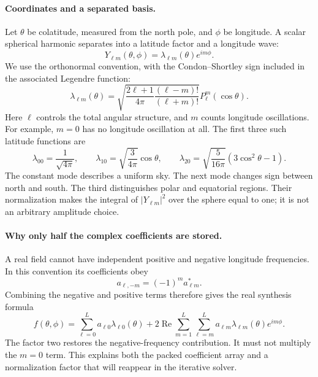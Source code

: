 \documentclass[11pt]{article}
\begin{document}
\paragraph{Coordinates and a separated basis.}
Let $\theta$ be colatitude, measured from the north pole, and $\phi$ be
longitude. A scalar spherical harmonic separates into a latitude factor
and a longitude wave:
\begin{equation}
 Y_{\ell m}(\theta,\phi)=\lambda_{\ell m}(\theta)e^{im\phi}.
\end{equation}
We use the orthonormal convention, with the Condon--Shortley sign included
in the associated Legendre function:
\begin{equation}
 \lambda_{\ell m}(\theta)=
 \sqrt{\frac{2\ell+1}{4\pi}\frac{(\ell-m)!}{(\ell+m)!}}
 P_\ell^m(\cos\theta).
\end{equation}
Here $\ell$ controls the total angular structure, and $m$ counts longitude
oscillations. For example, $m=0$ has no longitude oscillation at all.
The first three such latitude functions are
\begin{equation}
 \lambda_{00}=\frac{1}{\sqrt{4\pi}},\qquad
 \lambda_{10}=\sqrt{\frac{3}{4\pi}}\cos\theta,\qquad
 \lambda_{20}=\sqrt{\frac{5}{16\pi}}(3\cos^2\theta-1).
\end{equation}
The constant mode describes a uniform sky. The next mode changes sign
between north and south. The third distinguishes polar and equatorial
regions. Their normalization makes the integral of $|Y_{\ell m}|^2$ over
the sphere equal to one; it is not an arbitrary amplitude choice.

\paragraph{Why only half the complex coefficients are stored.}
A real field cannot have independent positive and negative longitude
frequencies. In this convention its coefficients obey
\begin{equation}
 a_{\ell,-m}=(-1)^m a_{\ell m}^{*}.
\end{equation}
Combining the negative and positive terms therefore gives the real synthesis
formula
\begin{equation}
 f(\theta,\phi)=\sum_{\ell=0}^{L}a_{\ell0}\lambda_{\ell0}(\theta)
 +2\operatorname{Re}\sum_{m=1}^{L}\sum_{\ell=m}^{L}
 a_{\ell m}\lambda_{\ell m}(\theta)e^{im\phi}.
\label{eq:real-synthesis}
\end{equation}
The factor two restores the negative-frequency contribution. It must not
multiply the $m=0$ term. This explains both the packed coefficient array
and a normalization factor that will reappear in the iterative solver.
\end{document}

